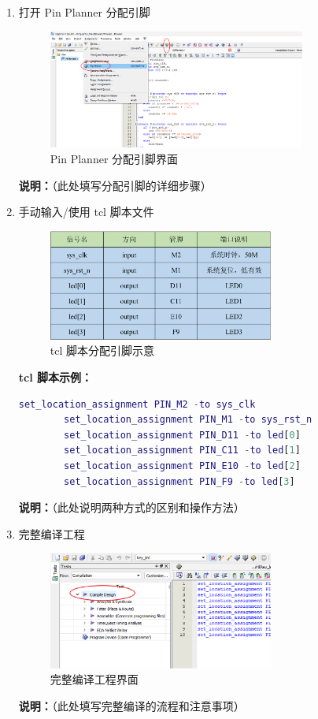 \documentclass[UTF8]{article}
\theoremstyle{MyLineTheoremStyle} %
\theoremstyle{MyBlockTheoremStyle} %
\theoremstyle{MySubsubsectionStyle} %
\begin{document}
\begin{enumerate}
    \item 打开 Pin Planner 分配引脚
    \begin{figure}[H]
        \centering
        \includegraphics[width=0.8\textwidth]{step6.png}
        \caption{Pin Planner 分配引脚界面}
        \label{fig:step6}
    \end{figure}
    \textbf{说明：}（此处填写分配引脚的详细步骤）

\cleardoublepage

    \item 手动输入/使用 tcl 脚本文件
    \begin{figure}[H]
        \centering
        \includegraphics[width=0.7\textwidth]{step7.png}
        \caption{tcl 脚本分配引脚示意}
        \label{fig:step7}
    \end{figure}
    \textbf{tcl 脚本示例：}
    \begin{lstlisting}[language=Matlab, style=MatlabStyle_src]
        set_location_assignment PIN_M2 -to sys_clk
        set_location_assignment PIN_M1 -to sys_rst_n
        set_location_assignment PIN_D11 -to led[0]
        set_location_assignment PIN_C11 -to led[1]
        set_location_assignment PIN_E10 -to led[2]
        set_location_assignment PIN_F9 -to led[3]
    \end{lstlisting}
    \textbf{说明：}（此处说明两种方式的区别和操作方法）

    \item 完整编译工程
    \begin{figure}[H]
        \centering
        \includegraphics[width=0.7\textwidth]{step8.png}
        \caption{完整编译工程界面}
        \label{fig:step8}
    \end{figure}
    \textbf{说明：}（此处填写完整编译的流程和注意事项）


\end{enumerate}
\end{document}
